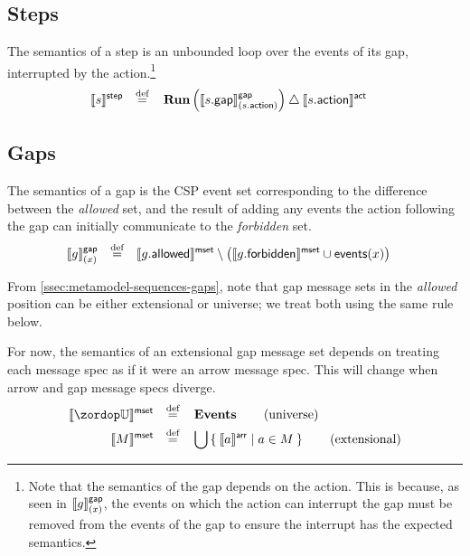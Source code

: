 \subsection{Steps}

\begin{defn}[Step]

The semantics of a step is an unbounded loop over the events of its gap,
interrupted by the action.\footnote{Note that the semantics of the gap depends
on the action.  This is because, as seen in \(\llbracket g \rrbracket^{\mathsf{gap}}_{(x)}\),
the events on which the action can interrupt the
gap must be removed from the events of the gap to ensure the interrupt has the
expected semantics.}
%
\begin{align*}
	\llbracket s \rrbracket^{\mathsf{step}}
\quad\mathbin{\overset{\text{def}}=}\quad&	
	\operatorname{\mathbf{Run}}\left(\llbracket s.\mathsf{gap} \rrbracket^{\mathsf{gap}}_{(s.\mathsf{action})}\right)
	\mathbin{\triangle} \llbracket s.\mathsf{action} \rrbracket^{\mathsf{act}}
\end{align*}
\end{defn}

\subsection{Gaps}

\begin{defn}[Gaps]
	The semantics of a gap is the CSP event set corresponding to the
	difference between the \emph{allowed} set,
	and the result of adding any events
	the action following the gap can initially communicate to the
	\emph{forbidden} set.
%
\begin{align*}
	\llbracket 
		g
	 \rrbracket^{\mathsf{gap}}_{(x)}
\quad\mathbin{\overset{\text{def}}=}\quad&
	\llbracket g.\mathsf{allowed} \rrbracket^{\mathsf{mset}}
	\setminus
	\left(\llbracket g.\mathsf{forbidden} \rrbracket^{\mathsf{mset}} \cup \mathsf{events}(x)\right)
\end{align*}
\end{defn}

\begin{defn}

From \cref{ssec:metamodel-sequences-gaps}, note that gap message sets in the
\emph{allowed} position can be either extensional or universe; we treat both
using the same rule below.

For now, the semantics of an extensional gap message set depends on treating each
message
spec as if it were an arrow message spec.  This will change when arrow and gap
message specs diverge.
%
\begin{align*}
	\msgsetsema{\universe}
\quad\defeq\quad&
	\events
\tag{universe}
\\
	\msgsetsema{\amsgset}
\quad\defeq\quad&
	\bigcup \Set{\arrsema{\anarrow} | \anarrow \in \amsgset }
\tag{extensional}
\end{align*}
\end{defn}

